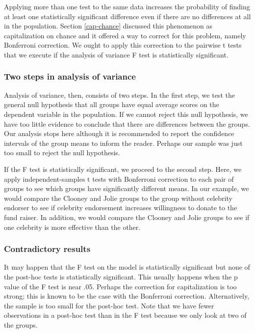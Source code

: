 \documentclass[a4paper]{book}
\theoremstyle{definition}
\theoremstyle{definition}
\theoremstyle{definition}
\theoremstyle{remark}
\begin{document}
Applying more than one test to the same data increases the probability
of finding at least one statistically significant difference even if
there are no differences at all in the population. Section
\ref{cap-chance} discussed this phenomenon as capitalization on chance
and it offered a way to correct for this problem, namely Bonferroni
correction. We ought to apply this correction to the pairwise t tests
that we execute if the analysis of variance F test is statistically
significant.

\subsubsection{Two steps in analysis of
variance}\label{two-steps-in-analysis-of-variance}

Analysis of variance, then, consists of two steps. In the first step, we
test the general null hypothesis that all groups have equal average
scores on the dependent variable in the population. If we cannot reject
this null hypothesis, we have too little evidence to conclude that there
are differences between the groups. Our analysis stops here although it
is recommended to report the confidence intervals of the group means to
inform the reader. Perhaps our sample was just too small to reject the
null hypothesis.

If the F test is statistically significant, we proceed to the second
step. Here, we apply independent-samples t tests with Bonferroni
correction to each pair of groups to see which groups have significantly
different means. In our example, we would compare the Clooney and Jolie
groups to the group without celebrity endorser to see if celebrity
endorsement increases willingness to donate to the fund raiser. In
addition, we would compare the Clooney and Jolie groups to see if one
celebrity is more effective than the other.

\subsubsection{Contradictory results}\label{contradictory-results}

It may happen that the F test on the model is statistically significant
but none of the post-hoc tests is statistically significant. This
usually happens when the p value of the F test is near .05. Perhaps the
correction for capitalization is too strong; this is known to be the
case with the Bonferroni correction. Alternatively, the sample is too
small for the post-hoc test. Note that we have fewer observations in a
post-hoc test than in the F test because we only look at two of the
groups.
\end{document}
